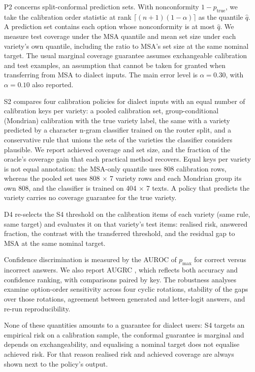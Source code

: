 \documentclass[applsci,article,submit,pdftex,oneauthor]{Definitions/mdpi}
\begin{document}
P2 concerns split-conformal prediction sets. With nonconformity $1-p_{\mathrm{true}}$, we take the calibration order statistic at rank $\lceil(n+1)(1-\alpha)\rceil$ as the quantile $\hat q$. A prediction set contains each option whose nonconformity is at most $\hat q$. We measure test coverage under the MSA quantile and mean set size under each variety's own quantile, including the ratio to MSA's set size at the same nominal target. The usual marginal coverage guarantee assumes exchangeable calibration and test examples, an assumption that cannot be taken for granted when transferring from MSA to dialect inputs. The main error level is $\alpha=0.30$, with $\alpha=0.10$ also reported.

S2 compares four calibration policies for dialect inputs with an equal number of calibration keys per variety: a pooled calibration set, group-conditional (Mondrian) calibration with the true variety label, the same with a variety predicted by a character n-gram classifier trained on the router split, and a conservative rule that unions the sets of the varieties the classifier considers plausible. We report achieved coverage and set size, and the fraction of the oracle's coverage gain that each practical method recovers. Equal keys per variety is not equal annotation: the MSA-only quantile uses 808 calibration rows, whereas the pooled set uses 808 $\times$ 7 variety rows and each Mondrian group its own 808, and the classifier is trained on 404 $\times$ 7 texts. A policy that predicts the variety carries no coverage guarantee for the true variety.

D4 re-selects the S4 threshold on the calibration items of each variety (same rule, same target) and evaluates it on that variety's test items: realised risk, answered fraction, the contrast with the transferred threshold, and the residual gap to MSA at the same nominal target.

Confidence discrimination is measured by the AUROC of $p_{\max}$ for correct versus incorrect answers. We also report AUGRC \cite{traub2024overcoming}, which reflects both accuracy and confidence ranking, with comparisons paired by key. The robustness analyses examine option-order sensitivity across four cyclic rotations, stability of the gaps over those rotations, agreement between generated and letter-logit answers, and re-run reproducibility.

None of these quantities amounts to a guarantee for dialect users: S4 targets an empirical risk on a calibration sample, the conformal guarantee is marginal and depends on exchangeability, and equalising a nominal target does not equalise achieved risk. For that reason realised risk and achieved coverage are always shown next to the policy's output.
\end{document}
